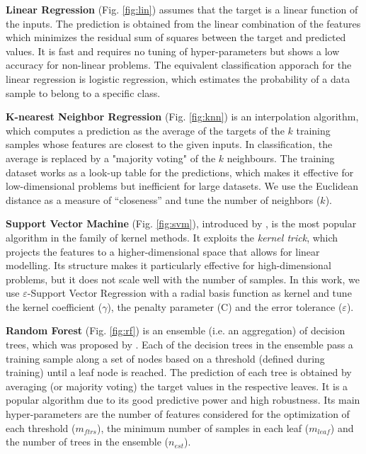 \textbf{Linear Regression }(Fig. \ref{fig:lin}) assumes that the target is a linear function of the inputs. The prediction is obtained from the linear combination of the features which minimizes the residual sum of squares between the target and predicted values. It is fast and requires no tuning of hyper-parameters but shows a low accuracy for non-linear problems. The equivalent classification apporach for the linear regression is logistic regression, which estimates the probability of a data sample to belong to a specific class.

\textbf{K-nearest Neighbor Regression} (Fig. \ref{fig:knn}) is an interpolation algorithm, which computes a prediction as the average of the targets of the $k$ training samples whose features are closest to the given inputs. In classification, the average is replaced by a "majority voting" of the $k$ neighbours. The training dataset works as a look-up table for the predictions, which makes it effective for low-dimensional problems but inefficient for large datasets. We use the Euclidean distance as a measure of “closeness” and tune the number of neighbors ($k$).

\textbf{Support Vector Machine} (Fig. \ref{fig:svm}), introduced by \citet{cortes_support-vector_1995}, is the most popular algorithm in the family of kernel methods. It exploits the \textit{kernel trick}, which projects the features to a higher-dimensional space that allows for linear modelling. Its structure makes it particularly effective for high-dimensional problems, but it does not scale well with the number of samples. In this work, we use $\varepsilon$-Support Vector Regression with a radial basis function as kernel and tune the kernel coefficient ($\gamma$), the penalty parameter (C) and the error tolerance ($\varepsilon$).

\textbf{Random Forest} (Fig. \ref{fig:rf}) is an ensemble (i.e. an aggregation) of decision trees, which was proposed by \citet{breiman_random_2001}. Each of the decision trees in the ensemble pass a training sample along a set of nodes based on a threshold (defined during training) until a leaf node is reached. The prediction of each tree is obtained by averaging (or majority voting) the target values in the respective leaves. It is a popular algorithm due to its good predictive power and high robustness. Its main hyper-parameters are the number of features considered for the optimization of each threshold ($m_{ftrs}$), the minimum number of samples in each leaf ($m_{leaf}$) and the number of trees in the ensemble ($n_{est}$).

